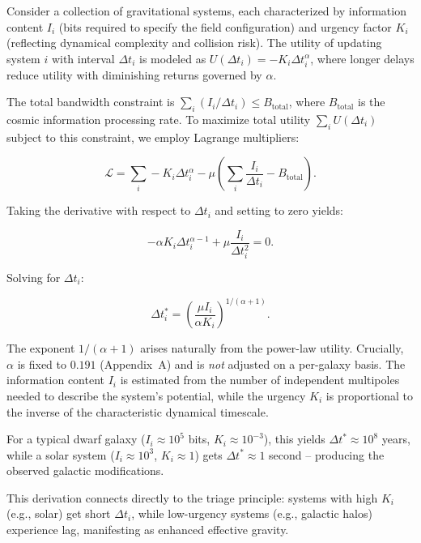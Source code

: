 \documentclass[usenatbib]{mnras}
\begin{document}
Consider a collection of gravitational systems, each characterized by information content $I_i$ (bits required to specify the field configuration) and urgency factor $K_i$ (reflecting dynamical complexity and collision risk). The utility of updating system $i$ with interval $\Delta t_i$ is modeled as $U(\Delta t_i) = -K_i \Delta t_i^\alpha$, where longer delays reduce utility with diminishing returns governed by $\alpha$.

The total bandwidth constraint is $\sum_i (I_i / \Delta t_i) \leq B_\mathrm{total}$, where $B_\mathrm{total}$ is the cosmic information processing rate. To maximize total utility $\sum_i U(\Delta t_i)$ subject to this constraint, we employ Lagrange multipliers:

\begin{equation}
\mathcal{L} = \sum_i -K_i \Delta t_i^\alpha - \mu \left( \sum_i \frac{I_i}{\Delta t_i} - B_\mathrm{total} \right).
\end{equation}

Taking the derivative with respect to $\Delta t_i$ and setting to zero yields:

\begin{equation}
-\alpha K_i \Delta t_i^{\alpha-1} + \mu \frac{I_i}{\Delta t_i^2} = 0.
\end{equation}

Solving for $\Delta t_i$:

\begin{equation}
\Delta t_i^* = \left( \frac{\mu I_i}{\alpha K_i} \right)^{1/(\alpha+1)}.
\end{equation}

The exponent $1/(\alpha+1)$ arises naturally from the power-law utility. Crucially, $\alpha$ is fixed to $0.191$ (Appendix~A) and is \emph{not} adjusted on a per-galaxy basis. The information content $I_i$ is estimated from the number of independent multipoles needed to describe the system's potential, while the urgency $K_i$ is proportional to the inverse of the characteristic dynamical timescale.

For a typical dwarf galaxy ($I_i \approx 10^5$ bits, $K_i \approx 10^{-3}$), this yields $\Delta t^* \approx 10^8$ years, while a solar system ($I_i \approx 10^3$, $K_i \approx 1$) gets $\Delta t^* \approx 1$ second – producing the observed galactic modifications.

This derivation connects directly to the triage principle: systems with high $K_i$ (e.g., solar) get short $\Delta t_i$, while low-urgency systems (e.g., galactic halos) experience lag, manifesting as enhanced effective gravity.
\end{document}
